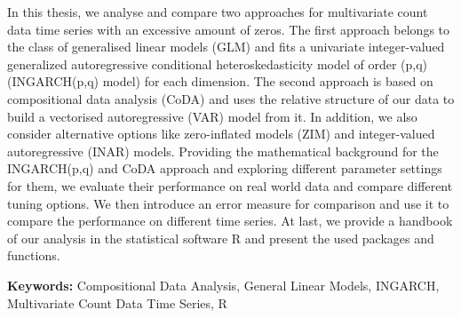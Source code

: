 In this thesis, we analyse and compare two approaches for multivariate count data time series with an excessive amount of zeros. The first approach belongs to the class of generalised linear models (GLM) and fits a univariate integer-valued generalized autoregressive conditional heteroskedasticity model of order (p,q) (INGARCH(p,q) model) for each dimension. The second approach is based on compositional data analysis (CoDA) and uses the relative structure of our data to build a vectorised autoregressive (VAR) model from it. In addition, we also consider alternative options like zero-inflated models (ZIM) and integer-valued autoregressive (INAR) models. Providing the mathematical background for the INGARCH(p,q) and CoDA approach and exploring different parameter settings for them, we evaluate their performance on real world data and compare different tuning options. We then introduce an error measure for comparison and use it to compare the performance on different time series. At last, we provide a handbook of our analysis in the statistical software R and present the used packages and functions. \newline

\textbf{Keywords:} Compositional Data Analysis, General Linear Models, INGARCH, Multivariate Count Data Time Series, R